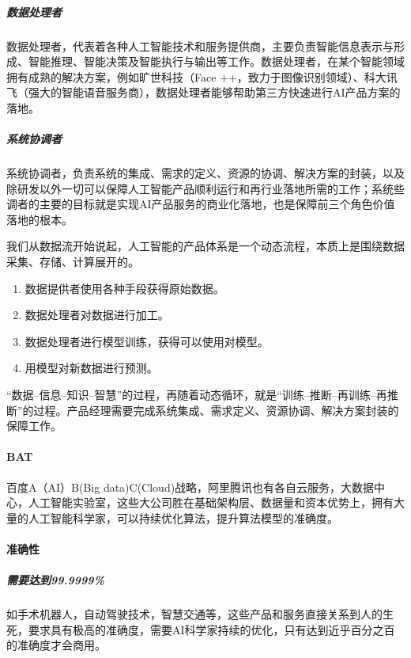 \documentclass[letterpaper,11pt,english]{sphinxmanual}
\begin{document}
\subparagraph{数据处理者}
\label{\detokenize{chapter_project/AI_industry_analysis:id13}}
数据处理者，代表着各种人工智能技术和服务提供商，主要负责智能信息表示与形成、智能推理、智能决策及智能执行与输出等工作。数据处理者，在某个智能领域拥有成熟的解决方案，例如旷世科技（Face
++，致力于图像识别领域）、科大讯飞（强大的智能语音服务商），数据处理者能够帮助第三方快速进行AI产品方案的落地。


\subparagraph{系统协调者}
\label{\detokenize{chapter_project/AI_industry_analysis:id14}}
系统协调者，负责系统的集成、需求的定义、资源的协调、解决方案的封装，以及除研发以外一切可以保障人工智能产品顺利运行和再行业落地所需的工作；系统些调者的主要的目标就是实现AI产品服务的商业化落地，也是保障前三个角色价值落地的根本。

我们从数据流开始说起，人工智能的产品体系是一个动态流程，本质上是围绕数据采集、存储、计算展开的。
\begin{enumerate}
%
\item {} 
数据提供者使用各种手段获得原始数据。

\item {} 
数据处理者对数据进行加工。

\item {} 
数据处理者进行模型训练，获得可以使用对模型。

\item {} 
用模型对新数据进行预测。

\end{enumerate}

“数据–信息–知识–智慧”的过程，再随着动态循环，就是“训练–推断–再训练–再推断”的过程。产品经理需要完成系统集成、需求定义、资源协调、解决方案封装的保障工作。


\paragraph{BAT}
\label{\detokenize{chapter_project/AI_industry_analysis:bat}}
百度A（AI）B(Big
data)C(Cloud)战略，阿里腾讯也有各自云服务，大数据中心，人工智能实验室，这些大公司胜在基础架构层、数据量和资本优势上，拥有大量的人工智能科学家，可以持续优化算法，提升算法模型的准确度。


\paragraph{准确性}
\label{\detokenize{chapter_project/AI_industry_analysis:id15}}

\subparagraph{需要达到99.9999\%}
\label{\detokenize{chapter_project/AI_industry_analysis:id16}}
如手术机器人，自动驾驶技术，智慧交通等，这些产品和服务直接关系到人的生死，要求具有极高的准确度，需要AI科学家持续的优化，只有达到近乎百分之百的准确度才会商用。
\end{document}
